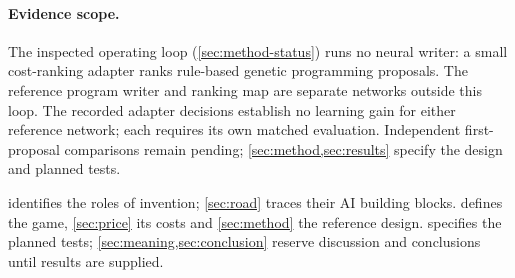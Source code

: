 \paragraph{Evidence scope.}
The inspected operating loop (\cref{sec:method-status}) runs no neural writer:
a small cost-ranking adapter ranks rule-based genetic programming proposals. The reference program writer and ranking map are separate networks outside this loop. The recorded adapter decisions establish no learning gain for either reference network; each requires its own matched evaluation.
Independent first-proposal comparisons remain pending;
\cref{sec:method,sec:results} specify the design and planned tests.

 identifies the roles of invention; \cref{sec:road}
traces their AI building blocks.  defines the game,
\cref{sec:price} its costs and \cref{sec:method} the reference design.
 specifies the planned tests; \cref{sec:meaning,sec:conclusion}
reserve discussion and conclusions until results are supplied.
